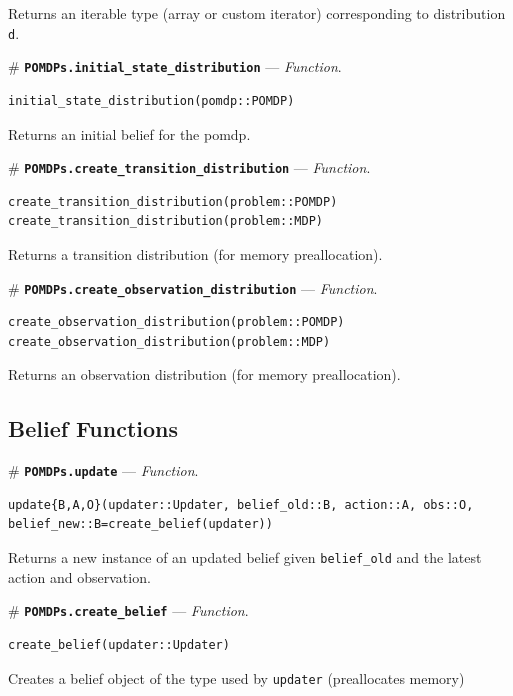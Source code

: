 \documentclass[12pt,]{article}
\begin{document}
Returns an iterable type (array or custom iterator) corresponding to
distribution \texttt{d}.

\# \textbf{\texttt{POMDPs.initial\_state\_distribution}} ---
\emph{Function}.

\begin{verbatim}
initial_state_distribution(pomdp::POMDP)
\end{verbatim}

Returns an initial belief for the pomdp.

\# \textbf{\texttt{POMDPs.create\_transition\_distribution}} ---
\emph{Function}.

\begin{verbatim}
create_transition_distribution(problem::POMDP)
create_transition_distribution(problem::MDP)
\end{verbatim}

Returns a transition distribution (for memory preallocation).

\# \textbf{\texttt{POMDPs.create\_observation\_distribution}} ---
\emph{Function}.

\begin{verbatim}
create_observation_distribution(problem::POMDP)
create_observation_distribution(problem::MDP)
\end{verbatim}

Returns an observation distribution (for memory preallocation).

\subsection{Belief Functions}\label{belief-functions}

\# \textbf{\texttt{POMDPs.update}} --- \emph{Function}.

\begin{verbatim}
update{B,A,O}(updater::Updater, belief_old::B, action::A, obs::O,
belief_new::B=create_belief(updater))
\end{verbatim}

Returns a new instance of an updated belief given \texttt{belief\_old}
and the latest action and observation.

\# \textbf{\texttt{POMDPs.create\_belief}} --- \emph{Function}.

\begin{verbatim}
create_belief(updater::Updater)
\end{verbatim}

Creates a belief object of the type used by \texttt{updater}
(preallocates memory)
\end{document}
